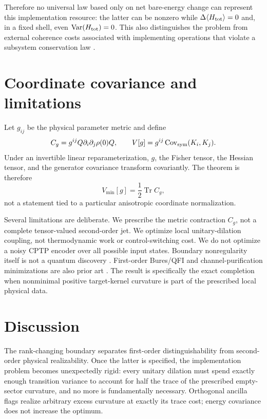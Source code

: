 \documentclass[aps,pra,preprint,nofootinbib]{revtex4-2}
\newcommand{\Tr}{\operatorname{Tr}}
\newcommand{\Var}{\operatorname{Var}}
\newcommand{\Htot}{H_{\rm tot}}
\begin{document}
Therefore no universal law based only on net bare-energy change can represent this implementation resource: the latter can be nonzero while $\Delta\langle\Htot\rangle=0$ and, in a fixed shell, even $\Var(\Htot)=0$. This also distinguishes the problem from external coherence costs associated with implementing operations that violate a subsystem conservation law \cite{TajimaShiraishiSaito2020}.

\section{Coordinate covariance and limitations}

Let $g_{ij}$ be the physical parameter metric and define
\begin{equation}
 C_g=g^{ij}Q\partial_i\partial_j\rho(0)Q,
 \qquad
 V[g]=g^{ij}\operatorname{Cov}_{\rm sym}(K_i,K_j).
\end{equation}
Under an invertible linear reparameterization, $g$, the Fisher tensor, the Hessian tensor, and the generator covariance transform covariantly. The theorem is therefore
\begin{equation}
 \boxed{V_{\min}[g]=\frac12\Tr C_g,}
\end{equation}
not a statement tied to a particular anisotropic coordinate normalization.

Several limitations are deliberate. We prescribe the metric contraction $C_g$, not a complete tensor-valued second-order jet. We optimize local unitary-dilation coupling, not thermodynamic work or control-switching cost. We do not optimize a noisy CPTP encoder over all possible input states. Boundary nonregularity itself is not a quantum discovery \cite{Chernoff1954,Shapiro1985,SelfLiang1987}. First-order Bures/QFI and channel-purification minimizations are also prior art \cite{BraunsteinCaves1994,FujiwaraImai2008,EscherEtAl2011,DemkowiczKolodynskiGuta2012,CarrascoSpehner2026}. The result is specifically the exact completion when nonminimal positive target-kernel curvature is part of the prescribed local physical data.

\section{Discussion}

The rank-changing boundary separates first-order distinguishability from second-order physical realizability. Once the latter is specified, the implementation problem becomes unexpectedly rigid: every unitary dilation must spend exactly enough transition variance to account for half the trace of the prescribed empty-sector curvature, and no more is fundamentally necessary. Orthogonal ancilla flags realize arbitrary excess curvature at exactly its trace cost; energy covariance does not increase the optimum.
\end{document}
